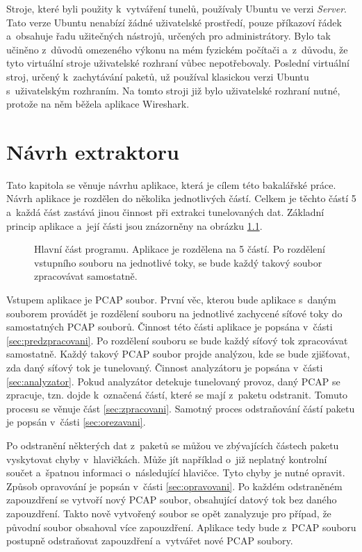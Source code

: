 Stroje, které byli použity k~vytváření tunelů, používaly Ubuntu ve verzi \emph{Server}. Tato verze Ubuntu nenabízí žádné uživatelské prostředí, pouze příkazoví řádek a~obsahuje řadu užitečných nástrojů, určených pro administrátory. Bylo tak učiněno z~důvodů omezeného výkonu na mém fyzickém počítači a~z~důvodu, že tyto virtuální stroje uživatelské rozhraní vůbec nepotřebovaly. Poslední virtuální stroj, určený k~zachytávání paketů, už používal klasickou verzi Ubuntu s~uživatelským rozhraním. Na tomto stroji již bylo uživatelské rozhraní nutné, protože na něm běžela aplikace Wireshark. 

\chapter{Návrh extraktoru}
\label{chap:navrh}
Tato kapitola se věnuje návrhu aplikace, která je cílem této bakalářské práce. Návrh aplikace je rozdělen do několika jednotlivých částí. Celkem je těchto částí 5 a~každá část zastává jinou činnost při extrakci tunelovaných dat. Základní princip aplikace a~její části jsou znázorněny na obrázku \ref{img:hlavni}.

\begin{figure}[H]
    \centering
    \caption{Hlavní část programu. Aplikace je rozdělena na 5 částí. Po rozdělení vstupního souboru na jednotlivé toky, se bude každý takový soubor zpracovávat samostatně.}
    \label{img:hlavni}
\end{figure}

Vstupem aplikace je PCAP soubor. První věc, kterou bude aplikace s~daným souborem provádět je rozdělení souboru na jednotlivé zachycené síťové toky do samostatných PCAP souborů. Činnost této části aplikace je popsána v~části \ref{sec:predzpracovani}. Po rozdělení souboru se bude každý síťový tok zpracovávat samostatně. Každý takový PCAP soubor projde analýzou, kde se bude zjišťovat, zda daný síťový tok je tunelovaný. Činnost analyzátoru je popsána v~části \ref{sec:analyzator}. Pokud analyzátor detekuje tunelovaný provoz, daný PCAP se zpracuje, tzn. dojde k~označená částí, které se mají z~paketu odstranit. Tomuto procesu se věnuje část \ref{sec:zpracovani}. Samotný proces odstraňování částí paketu je popsán v~části \ref{sec:orezavani}. 

Po odstranění některých dat z~paketů se můžou ve zbývajících částech paketu vyskytovat chyby v~hlavičkách. Může jít například o~již neplatný kontrolní součet a~špatnou informaci o~následující hlavičce. Tyto chyby je nutné opravit. Způsob opravování je popsán v~části \ref{sec:opravovani}. Po každém odstraněném zapouzdření se vytvoří nový PCAP soubor, obsahující datový tok bez daného zapouzdření. Takto nově vytvořený soubor se opět zanalyzuje pro případ, že původní soubor obsahoval více zapouzdření. Aplikace tedy bude z~PCAP souboru postupně odstraňovat zapouzdření a~vytvářet nové PCAP soubory.

